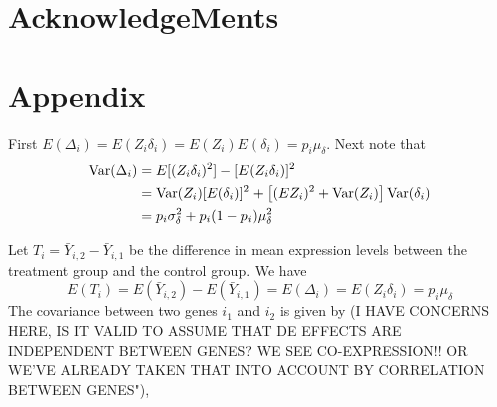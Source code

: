 \documentclass[useAMS,usenatbib, galley]{biom}
\begin{document}
	
	\section{AcknowledgeMents}\label{section:acknowledgement}
	
	\section{Appendix}\label{section:appendix}
	
	First $E(\Delta_i) = E(Z_i\delta_i) = E(Z_i)E(\delta_i) = p_i\mu_{\delta}$. Next note that  
	\begin{equation}\notag
	\begin{aligned}
	\text{Var}(\Delta_i) & = E[(Z_i\delta_i)^2]- [E(Z_i\delta_i)]^2 \\
	& = \text{Var}(Z_i)[E(\delta_i)]^2 + \left[(EZ_i)^2 + \text{Var}(Z_i)\right]\text{Var}(\delta_i) \\
	& =p_i\sigma_{\delta}^2 + p_i(1-p_i)\mu_{\delta}^2
	\end{aligned}
	\end{equation}
	
	Let $T_i=\bar{Y}_{i,2}-\bar{Y}_{i,1}$ be the difference in mean expression levels between the treatment group and the control group. We have 
	\[E(T_i) = E(\bar{Y}_{i,2})-E(\bar{Y}_{i,1}) = E(\Delta_i) = E(Z_i\delta_i) = p_i\mu_{\delta}\]
	The covariance between two genes $i_1$ and $i_2$ is given by (I HAVE CONCERNS HERE, IS IT VALID TO ASSUME THAT DE EFFECTS ARE INDEPENDENT BETWEEN GENES?  WE SEE CO-EXPRESSION!! OR WE'VE ALREADY TAKEN THAT INTO ACCOUNT BY CORRELATION BETWEEN GENES"), 
	
\end{document}
